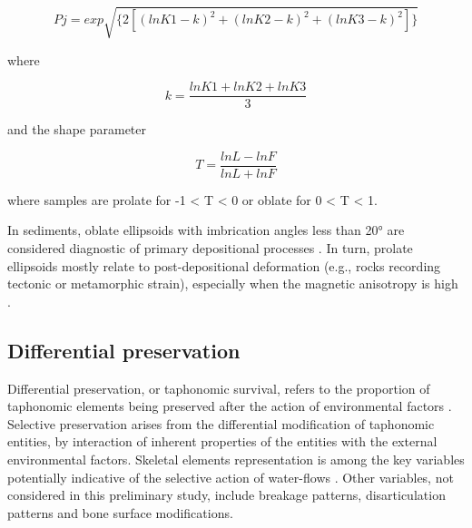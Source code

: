 \documentclass[5p,times,authoryear]{elsarticle}
\begin{document}
$$Pj=exp\sqrt{\{2[(lnK1-k)^2+(lnK2-k)^2+(lnK3-k)^2]\}}$$

where

$$k=\frac{lnK1+lnK2+lnK3}{3}$$

and the shape parameter

$$T=\frac{lnL-lnF}{lnL+lnF}$$

where samples are prolate for -1 < T < 0 or oblate for 0 < T < 1.

In sediments, oblate ellipsoids with imbrication angles less than 20° are considered diagnostic of primary depositional processes \citep{Hamilton1970,Hrouda1982,Tarling1993,Liu2001,Lanza2006}. In turn, prolate ellipsoids mostly relate to post-depositional deformation (e.g., rocks recording tectonic or metamorphic strain), especially when the magnetic anisotropy is high \citep{Hrouda1976}.

\subsection{Differential preservation}

Differential preservation, or taphonomic survival, refers to the proportion of taphonomic elements being preserved after the action of environmental factors \citep{Fernandez-Lopez2006}. Selective preservation arises from the differential modification of taphonomic entities, by interaction of inherent properties of the entities with the external environmental factors. Skeletal elements representation is among the key variables potentially indicative of the selective action of water-flows \citep[][among others]{Behrensmeyer1975a,Kaufmann2011,Voorhies1969}. Other variables, not considered in this preliminary study, include breakage patterns, disarticulation patterns and bone surface modifications.
\end{document}
